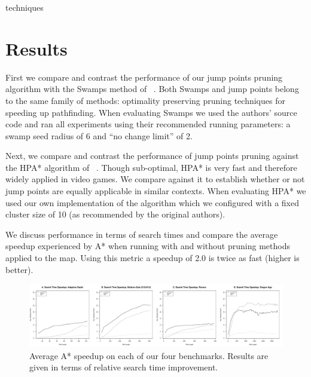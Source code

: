 techniques\section{Results}
First we compare and contrast the performance of our jump points
pruning algorithm with the Swamps method of
\citeauthor{pochter10}~. 
Both Swamps and jump points belong to the same family of methods:
optimality preserving pruning techniques for speeding up pathfinding.
When evaluating Swamps we used the authors'
source code and ran all experiments using their recommended running parameters:
a swamp seed radius of 6 and ``no change limit'' of 2. 
\par
Next, we compare and contrast the performance of jump points pruning 
against the HPA* algorithm of \citeauthor{botea04}~.
Though sub-optimal, HPA* is very fast and therefore widely applied in video
games. We compare against it to establish whether or not jump points are 
equally applicable in similar contexts. 
When evaluating HPA* we used our own implementation of the algorithm which we 
configured with a fixed cluster size of 10 (as recommended by the original authors).
\par
We discuss performance in terms of search times and compare 
the average speedup experienced by A* when running with and
without pruning methods applied to the map.  
Using this metric a speedup of 2.0 is twice as fast (higher is better).

\begin{figure}[t]
   \begin{center}
	   \includegraphics[width=2.0\columnwidth, trim = 10mm 10mm 10mm 0mm]
		{diagrams/speedup.pdf}
   \end{center}
   \caption{Average A* speedup on each of our four benchmarks. 
	Results are given in terms of relative search time improvement.}
\label{fig:speedup}
\end{figure}

